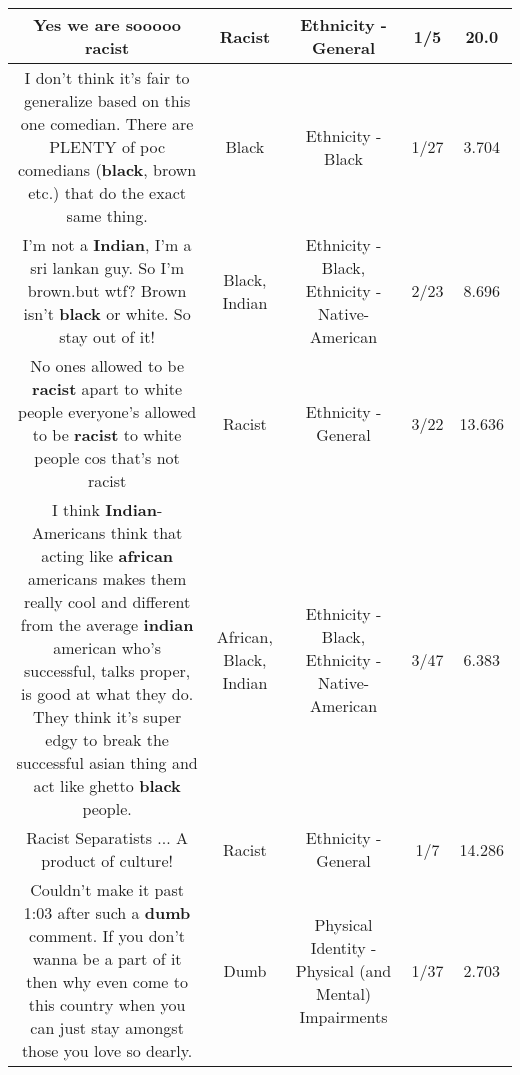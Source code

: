 \documentclass[11pt]{article}
\newlength\mylength
\begin{document}
\begin{center}
\begin{longtable}{|C{.65\mylength}|C{.30\mylength}|C{.12\mylength}|C{.12\mylength}|C{.12\mylength}|}
  \small Yes we are sooooo racist\normalsize   & Racist & Ethnicity - General & 1/5 & 20.0 \\  \hline
  \small I don't think it's fair to generalize based on this one comedian. There are PLENTY of poc comedians (\textbf{black}, brown etc.) that do the exact same thing.\normalsize   & Black & Ethnicity - Black & 1/27 & 3.704 \\  \hline
  \small I'm not a \textbf{Indian}, I'm a sri lankan guy. So I'm brown.but wtf? Brown isn't \textbf{black} or white. So stay out of it!\normalsize   & Black, Indian & Ethnicity - Black, Ethnicity - Native-American & 2/23 & 8.696 \\  \hline
  \small No ones allowed to be \textbf{racist} apart to white people everyone's allowed to be \textbf{racist} to white people cos that's not racist\normalsize   & Racist & Ethnicity - General & 3/22 & 13.636 \\  \hline
  \small I think \textbf{Indian}-Americans think that acting like \textbf{african} americans makes them really cool and different from the average \textbf{indian} american who's successful, talks proper, is good at what they do. They think it's super edgy to break the successful asian thing and act like ghetto \textbf{black} people.\normalsize   & African, Black, Indian & Ethnicity - Black, Ethnicity - Native-American & 3/47 & 6.383 \\  \hline
  \small Racist Separatists ... A product of culture!\normalsize   & Racist & Ethnicity - General & 1/7 & 14.286 \\  \hline
  \small Couldn't make it past 1:03 after such a \textbf{dumb} comment. If you don't wanna be a part of it then why even come to this country when you can just stay amongst those you love so dearly.\normalsize   & Dumb & Physical Identity - Physical (and Mental) Impairments & 1/37 & 2.703 \\  \hline

\end{longtable}
\end{center}
\end{document}
